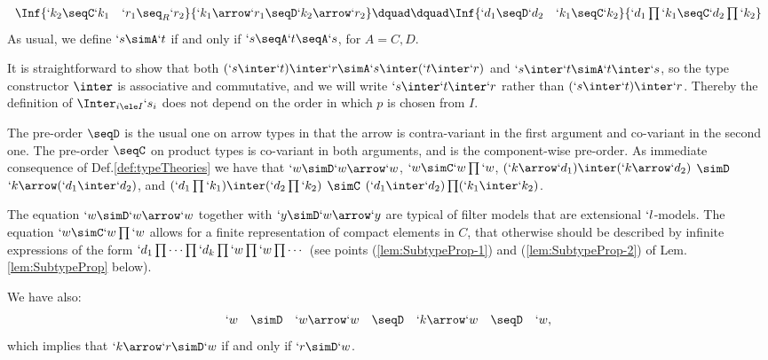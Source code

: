 \documentclass{lmcs}
\begin{document}
\begin{defi} 
\begin{enumerate}
 \[ \begin{array}{c@{\dquad\dquad}c}
\Inf	{`k_2 \seqC `k_1 \quad `r_1 \seq_R `r_2
	}{ `k_1\arrow `r_1 \seqD `k_2\arrow `r_2 }
	&
\Inf	{`d_1 \seqD`d_2 \quad `k_1 \seqC `k_2
	}{ `d_1\prod `k_1 \seqC `d_2\prod `k_2 }
 \end{array} \]
%
As usual, we define $`s \simA `t$ if and only if $`s \seqA `t \seqA `s$, for $A = C,D$.

 \end{enumerate}
 \end{defi}
It is straightforward to show that both $(`s \inter `t) \inter `r \simA `s \inter (`t \inter `r)$ and $`s \inter `t \simA `t \inter `s$, so the type constructor $\inter$ is associative and commutative, and we will write $`s \inter `t \inter `r$ rather than $(`s \inter `t) \inter `r$.
Thereby the definition of $ \Inter_{i \ele I}`s_i $ does not depend on the order in which $p$ is chosen from $I$.

The pre-order $\seqD$ is the usual one on arrow types in that the arrow is contra-variant in the first argument and co-variant in the second one. 
The pre-order $\seqC$ on product types is co-variant in both arguments, and is the component-wise pre-order. 
As immediate consequence of Def.\skp\ref{def:typeTheories} we have that $`w \simD `w\arrow `w $, $`w \simC `w\prod `w $, 
$ (`k\arrow `d_1) \inter (`k\arrow `d_2) $ 
	$\simD$
$`k\arrow(`d_1 \inter`d_2) $,
and
$ (`d_1\prod `k_1) \inter (`d_2\prod `k_2) $
	$\simC$ 
$(`d_1 \inter `d_2)\prod (`k_1 \inter `k_2) $.

The equation $`w \simD `w\arrow `w $ together with $`y \simD `w\arrow `y $ are typical of filter models that are extensional $`l$-models.
The equation $`w \simC `w\prod `w $ allows for a finite representation of compact elements in $C$, that otherwise should be described by infinite expressions of the form $`d_1\prod \cdots\prod `d_k\prod `w\prod `w\prod \cdots$ (see points (\ref{lem:SubtypeProp-1}) and (\ref{lem:SubtypeProp-2}) of Lem.\skp\ref{lem:SubtypeProp} below). 

We have also:
%
 \[ \begin{array}{rcl@{\quad}lccc}
`w &\simD& `w\arrow `w &\seqD& `k\arrow `w &\seqD& `w ,
 \end{array} \]
which implies that $`k\arrow `r \simD `w $ if and only if $`r\simD`w $.
\end{document}
